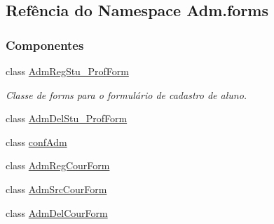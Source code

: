 \hypertarget{namespaceAdm_1_1forms}{\subsection{Refência do Namespace Adm.\-forms}
\label{namespaceAdm_1_1forms}
}
\subsubsection*{Componentes}
\begin{DoxyCompactItemize}
\item 
class \hyperlink{classAdm_1_1forms_1_1AdmRegStu__ProfForm}{Adm\-Reg\-Stu\-\_\-\-Prof\-Form}
\begin{DoxyCompactList}\small\item\em Classe de forms para o formulário de cadastro de aluno. \end{DoxyCompactList}\item 
class \hyperlink{classAdm_1_1forms_1_1AdmDelStu__ProfForm}{Adm\-Del\-Stu\-\_\-\-Prof\-Form}
\item 
class \hyperlink{classAdm_1_1forms_1_1confAdm}{conf\-Adm}
\item 
class \hyperlink{classAdm_1_1forms_1_1AdmRegCourForm}{Adm\-Reg\-Cour\-Form}
\item 
class \hyperlink{classAdm_1_1forms_1_1AdmSrcCourForm}{Adm\-Src\-Cour\-Form}
\item 
class \hyperlink{classAdm_1_1forms_1_1AdmDelCourForm}{Adm\-Del\-Cour\-Form}
\end{DoxyCompactItemize}
